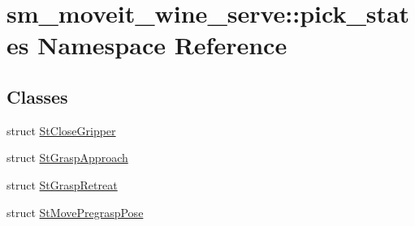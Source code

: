 \hypertarget{namespacesm__moveit__wine__serve_1_1pick__states}{}\section{sm\+\_\+moveit\+\_\+wine\+\_\+serve\+:\+:pick\+\_\+states Namespace Reference}
\label{namespacesm__moveit__wine__serve_1_1pick__states}
\subsection*{Classes}
\begin{DoxyCompactItemize}
\item 
struct \hyperlink{structsm__moveit__wine__serve_1_1pick__states_1_1StCloseGripper}{St\+Close\+Gripper}
\item 
struct \hyperlink{structsm__moveit__wine__serve_1_1pick__states_1_1StGraspApproach}{St\+Grasp\+Approach}
\item 
struct \hyperlink{structsm__moveit__wine__serve_1_1pick__states_1_1StGraspRetreat}{St\+Grasp\+Retreat}
\item 
struct \hyperlink{structsm__moveit__wine__serve_1_1pick__states_1_1StMovePregraspPose}{St\+Move\+Pregrasp\+Pose}
\end{DoxyCompactItemize}
